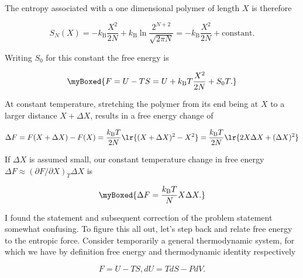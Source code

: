 {The entropy associated with a one dimensional polymer of length $X$ is therefore

\begin{equation}\label{eqn:basicStatMechProblemSet5Problem1:100}
S_N(X) 
= 
- k_{\mathrm{B}} \frac{X^2}{2N} + k_{\mathrm{B}} \ln \frac{2^{N + 2}}{\sqrt{2 \pi N}} 
= 
- k_{\mathrm{B}} \frac{X^2}{2N} + \text{constant}.
\end{equation}

Writing $S_0$ for this constant the free energy is

\begin{equation}\label{eqn:basicStatMechProblemSet5Problem1:120}
\myBoxed{
F = U - T S = U + k_{\mathrm{B}} T \frac{X^2}{2N} + S_0 T.
}
\end{equation}


At constant temperature, stretching the polymer from its end being at $X$ to a larger distance $X + \Delta X$, results in a free energy change of

\begin{dmath}\label{eqn:basicStatMechProblemSet5Problem1:260}
\Delta F 
= F( X + \Delta X ) - F(X)
=
 \frac{k_{\mathrm{B}} T}{2N} \lr{(X + \Delta X)^2 - X^2}
=
 \frac{k_{\mathrm{B}} T}{2N} \lr{ 2 X \Delta X + (\Delta X)^2 }
\end{dmath}

If $\Delta X$ is assumed small, our constant temperature change in free energy $\Delta F \approx (\partial F/\partial X)_T \Delta X$ is

\begin{equation}\label{eqn:basicStatMechProblemSet5Problem1:280}
\myBoxed{
\Delta F =
 \frac{k_{\mathrm{B}} T}{N} X \Delta X.
}
\end{equation}


I found the statement and subsequent correction of the problem statement somewhat confusing.  To figure this all out, let's step back and relate free energy to the entropic force.  Consider temporarily a general thermodynamic system, for which we have by definition free energy and thermodynamic identity respectively

\begin{subequations}
\begin{equation}\label{eqn:basicStatMechProblemSet5Problem1:140}
F = U - T S,
\end{equation}
\begin{equation}\label{eqn:basicStatMechProblemSet5Problem1:160}
dU = T dS - P dV.
\end{equation}
\end{subequations}

}
